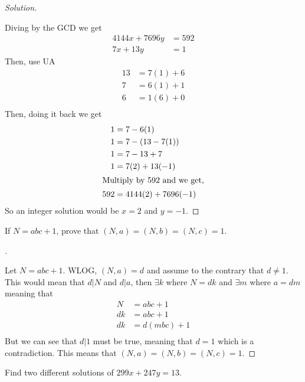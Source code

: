 \documentclass[11pt]{article}
\newenvironment{myproof}[1][\proofname]{%
  \begin{proof}[#1]$ $\par\nobreak\ignorespaces
}{%
  \end{proof}
}
\newenvironment{problem}[2][Problem]{\begin{trivlist}
\item[\hskip \labelsep {\bfseries #1}\hskip \labelsep {\bfseries #2.}]}{\end{trivlist}}
\newenvironment{solution}
  {\renewcommand\qedsymbol{$~$}\begin{proof}[Solution]$ $\par\nobreak\ignorespaces}
  {\end{proof}}
\begin{document}
\begin{solution}
  Diving by the GCD we get
  \begin{align*}
    4144x+7696y & =592 \\
    7x + 13y    & = 1
  \end{align*}
  Then, use UA
  \begin{align*}
    13 & = 7(1)+6   \\
    7  & = 6(1) + 1 \\
    6  & = 1(6) + 0 \\
  \end{align*}
  Then, doing it back we get
  \begin{align*}
    1   & = 7 - 6(1)           \\
    1   & = 7 - (13-7(1))      \\
    1   & = 7 - 13 + 7         \\
    1   & = 7(2) + 13(-1)      \\
    \intertext{Multiply by 592 and we get,}
    592 & = 4144(2) + 7696(-1) \\
  \end{align*}
  So an integer solution would be $x=2$ and $y=-1$.
\end{solution}



\begin{problem}{5}
If $N=abc+1$, prove that $(N,a)=(N,b)=(N,c)=1$.
\end{problem}

\begin{myproof}
  Let $N=abc+1$. WLOG, $(N,a)= d$ and assume to the contrary that $d\neq 1$. This would mean that $d|N$ and $d|a$, then $\exists k$ where $N=dk$ and $\exists m$ where $a=dm$ meaning that
  \begin{align*}
    N  & = abc +1     \\
    dk & = abc+ 1     \\
    dk & = d(mbc) + 1 \\
  \end{align*}
  But we can see that $d|1$ must be true, meaning that $d=1$ which is a contradiction. This means that $(N,a)=(N,b)=(N,c)=1$.
\end{myproof}


\begin{problem}{6}
Find two different solutions of $299x+247y=13$.
\end{problem}
\end{document}
